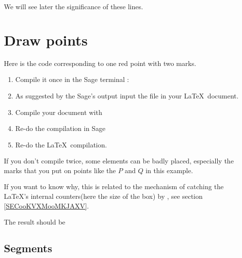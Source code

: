 We will see later the significance of these lines.

\section{Draw points}

Here is the code corresponding to one red point with two marks.



\begin{enumerate}
    \item
        
Compile it once in the Sage terminal :



\item

    As suggested by the Sage's output input the file  in your \LaTeX\ document.

\item

    Compile your document with 

\item
    Re-do the compilation in Sage
\item
    Re-do the \LaTeX\ compilation.
\end{enumerate}
If you don't compile twice, some elements can be badly placed, especially the marks that you put on points like the \( P\) and \( Q\) in this example.

If you want to know why, this is related to the mechanism of catching the \LaTeX's internal counters(here the size of the box) by \yanntricks, see section \ref{SECooKVXMooMKJAXV}.

The result should be

\begin{center}
   
\end{center}

\subsection{Segments}

